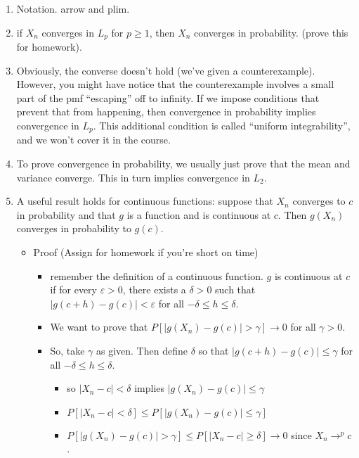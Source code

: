 \begin{enumerate}
\item Notation. arrow and plim.
\item if $X_n$ converges in $L_p$ for $p \geq 1$, then $X_n$
          converges in probability.  (prove this for homework).
\item Obviously, the converse doesn't hold (we've given a
          counterexample).  However, you might have notice that the
          counterexample involves a small part of the pmf ``escaping'' off
          to infinity.  If we impose conditions that prevent that from
          happening, then convergence in probability implies convergence
          in $L_p$.  This additional condition is called ``uniform
          integrability'', and we won't cover it in the course.
\item To prove convergence in probability, we usually just prove that
          the mean and variance converge.  This in turn implies
          convergence in $L_2$.
\item A useful result holds for continuous functions: suppose that
          $X_n$ converges to $c$ in probability and that $g$ is a
          function and is continuous at $c$.  Then $g(X_n)$ converges in
          probability to $g(c)$.
\begin{itemize}
\item Proof (Assign for homework if you're short on time)
\begin{itemize}
\item remember the definition of a continuous function.  $g$ is
              continuous at $c$ if for every $\varepsilon >0$, there
              exists a $\delta > 0$ such that $|g(c + h) - g(c)| <
              \varepsilon$ for all $-\delta \leq h \leq \delta$.
\item We want to prove that $P[|g(X_n) - g(c)| > \gamma]
              \to 0$ for all $\gamma > 0$.
\item So, take $\gamma$ as given.  Then define $\delta$ so that
              $|g(c + h) - g(c)| \leq \gamma$ for all $-\delta \leq h \leq \delta$.
\begin{itemize}
\item so $|X_n - c| < \delta$ implies $|g(X_n) - g(c)| \leq \gamma$
\item $P[|X_n - c| < \delta] \leq P[|g(X_n) - g(c)| \leq \gamma]$
\item $P[|g(X_n) - g(c)| > \gamma] \leq P[|X_n - c| \geq \delta] \to 0$ 
                since $X_n \to^p c$.
\end{itemize}

\end{itemize}
\end{itemize}
\end{enumerate}
